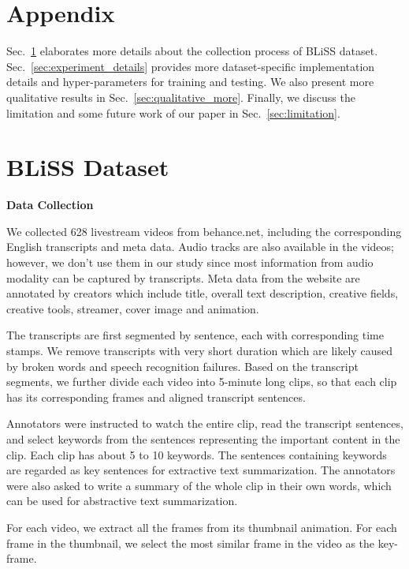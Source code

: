 \appendix
\section*{Appendix}


Sec.~\ref{sec:bliss} elaborates more details about the collection process of BLiSS dataset.
Sec.~\ref{sec:experiment_details} provides more dataset-specific implementation details and hyper-parameters for training and testing.
We also present more qualitative results in Sec.~\ref{sec:qualitative_more}.
Finally, we discuss the limitation and some future work of our paper in Sec.~\ref{sec:limitation}.


\section{BLiSS Dataset}
\label{sec:bliss}

\noindent\textbf{Data Collection}

We collected 628 livestream videos from behance.net, including the corresponding English transcripts and meta data.
Audio tracks are also available in the videos; however, we don't use them in our study since most information from audio modality can be captured by transcripts. Meta data from the website are annotated by creators which include title, overall text description, creative fields, creative tools, streamer, cover image and animation.

The transcripts are first segmented by sentence, each with corresponding time stamps. We remove transcripts with very short duration which are likely caused by broken words and speech recognition failures. Based on the transcript segments, we further divide each video into 5-minute long clips, so that each clip has its corresponding frames and aligned transcript sentences.

Annotators were instructed to watch the entire clip, read the transcript sentences, and select keywords from the sentences representing the important content in the clip. Each clip has about 5 to 10 keywords. The sentences containing keywords are regarded as key sentences for extractive text summarization. The annotators were also asked to write a summary of the whole clip in their own words, which can be used for abstractive text summarization.

For each video, we extract all the frames from its thumbnail animation. 
For each frame  in the thumbnail, we select the most similar frame  in the video as the key-frame.


